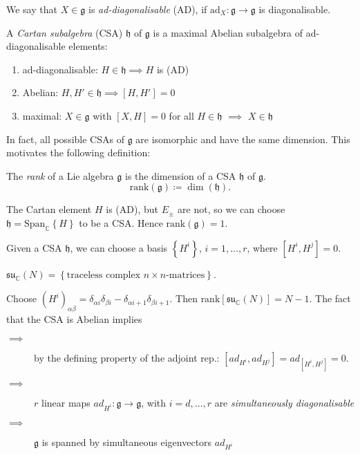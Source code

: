 \begin{definition}[]
  We say that $X \in \mathfrak{g}$ is \emph{ad-diagonalisable} (AD), if $\text{ad}_X \colon \mathfrak{g} \to \mathfrak{g}$ is diagonalisable.
\end{definition}
\begin{definition}[]
  A \emph{Cartan subalgebra} (CSA) $\mathfrak{h}$ of $\mathfrak{g}$ is a maximal Abelian subalgebra of ad-diagonalisable elements:
  \begin{enumerate}
    \item ad-diagonalisable: $H \in \mathfrak{h} \implies H$ is (AD)
    \item Abelian: $H, H' \in \mathfrak{h} \implies [H, H'] = 0$
    \item maximal: $X \in \mathfrak{g}$ with $[X, H] = 0$ for all $H \in \mathfrak{h}$ $\implies$ $X \in \mathfrak{h}$
  \end{enumerate}
\end{definition}
In fact, all possible CSAs of $\mathfrak{g}$ are isomorphic and have the same dimension. This motivates the following definition:
\begin{definition}
  The \emph{rank} of a Lie algebra $\mathfrak{g}$ is the dimension of a CSA $\mathfrak{h}$ of $\mathfrak{g}$.
  \begin{equation}
    \text{rank}(\mathfrak{g}) \coloneqq \dim(\mathfrak{h}).
  \end{equation}
\end{definition}
\begin{example}[$\mathfrak{g} = \mathfrak{su}_{\mathbb{C}}(2) = \text{span}_{\mathbb{C}} \left\{ H, E_{\pm} \right\}$]
  The Cartan element $H$ is (AD), but $E_{\pm}$  are not, so we can choose $\mathfrak{h} = \text{Span}_{\mathbb{C}}\left\{H\right\}$ to be a CSA. Hence $\text{rank}(\mathfrak{g}) = 1$. 
\end{example}
Given a CSA $\mathfrak{h}$, we can choose a basis $\left\{ H^{i}\right\}$, $ i = 1, \dots, r$, where $[H^{i}, H^{j}] = 0$.
\begin{example}[]
  $\mathfrak{su}_{\mathbb{C}}(N) = \left\{ \text{traceless complex $n \times n$-matrices} \right\}$. \par
  Choose $(H^{i})_{\alpha\beta} = \delta_{\alpha i} \delta_{\beta i} - \delta_{\alpha i + 1} \delta_{\beta i + 1}$.
  Then $\text{rank} [\mathfrak{su}_{\mathbb{C}}(N)] = N-1$. The fact that the CSA is Abelian implies
  \begin{description}
    \item[$\implies$] by the defining property of the adjoint rep.: $ [ad_{H^{i}}, ad_{H^{j}}] = ad_{[H^{i}, H^{j}]} = 0 $.
    \item[$\implies$] $r$ linear maps $ad_{H^{i}}\colon \mathfrak{g} \to \mathfrak{g}$, with $i = d, \dots, r$ are \emph{simultaneously diagonalisable}
    \item[$\implies$] $\mathfrak{g}$ is spanned by simultaneous eigenvectors $ad_{H^{i}}$
  \end{description}
\end{example}
